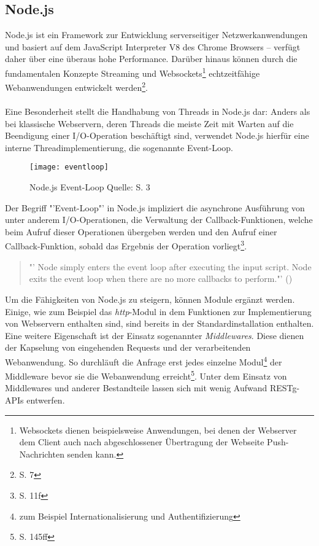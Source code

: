 \subsection{\label{Node.js}Node.js}
Node.js ist ein Framework zur Entwicklung serverseitiger Netzwerkanwendungen und basiert auf dem JavaScript Interpreter V8 des Chrome Browsers -- verfügt daher über eine überaus hohe Performance. Darüber hinaus können durch die fundamentalen Konzepte Streaming und Websockets\footnote{Websockets dienen beispielsweise Anwendungen, bei denen der Webserver dem Client auch nach abgeschlossener Übertragung der Webseite Push-Nachrichten senden kann.} echtzeitfähige Webanwendungen entwickelt werden\footnote{\cite{nodeCo} S. 7}. \\\\
Eine Besonderheit stellt die Handhabung von Threads in Node.js dar:
Anders als bei klassische Webservern, deren Threads die meiste Zeit mit Warten auf die Beendigung einer I/O-Operation beschäftigt sind, verwendet Node.js hierfür eine interne Threadimplementierung, die sogenannte Event-Loop. 
\begin{figure}[H]
 \centering
    \texttt{[image: eventloop]}
\caption[Node.js Event-Loop]{Node.js Event-Loop Quelle: \cite{nodeWay} S. 3}
\label{fig:Nodejs_eventloop}
\end{figure}
Der Begriff "'Event-Loop"' in Node.js impliziert die asynchrone Ausführung von unter anderem I/O-Operationen, die Verwaltung der Callback-Funktionen, welche beim Aufruf dieser Operationen übergeben werden und den Aufruf einer Callback-Funktion, sobald das Ergebnis der Operation vorliegt\footnote{\cite{nodeCo} S. 11f}.
\begin{quote}
"' Node simply enters the event loop after executing the input script. Node exits the event loop when there are no more callbacks to perform."' (\cite{node})
\end{quote}
Um die Fähigkeiten von Node.js zu steigern, können Module ergänzt werden. Einige, wie zum Beispiel das \textit{http}-Modul in dem Funktionen zur Implementierung von Webservern enthalten sind, sind bereits in der Standardinstallation enthalten. 
Eine weitere Eigenschaft ist der Einsatz sogenannter \textit{Middlewares}. Diese dienen der Kapselung von eingehenden Requests und der verarbeitenden Webanwendung. So durchläuft die Anfrage erst jedes einzelne Modul\footnote{zum Beispiel Internationalisierung und Authentifizierung} der Middleware bevor sie die Webanwendung erreicht\footnote{\cite{nodeCo} S. 145ff}. Unter dem Einsatz von Middlewares und anderer Bestandteile lassen sich mit wenig Aufwand \gls{RESTg}-\glspl{API} entwerfen.

